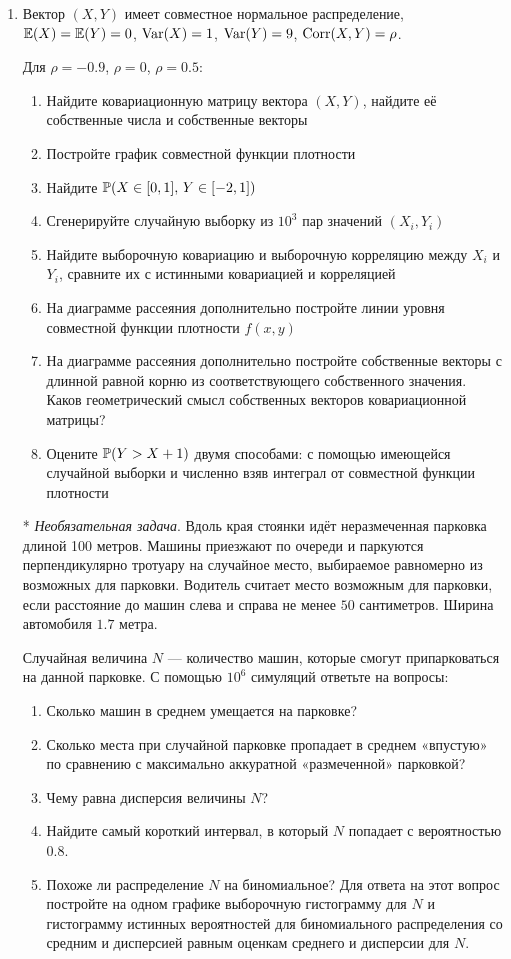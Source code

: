 \documentclass[12pt, a4paper]{article}\usepackage[]{graphicx}\usepackage[]{color}
\begin{document}
\begin{enumerate}
\item Вектор $(X,Y)$ имеет совместное нормальное распределение, $\E(X)=\E(Y)=0$, $\Var(X)=1$, $\Var(Y)=9$, $\Corr(X,Y)=\rho$.

Для $\rho=-0.9$, $\rho=0$, $\rho=0.5$:

\begin{enumerate}
\item Найдите ковариационную матрицу вектора  $(X,Y)$, найдите её собственные числа и собственные векторы
\item Постройте график совместной функции плотности
\item Найдите $\P(X\in [0,1], \, Y\in [-2,1] )$
\item Сгенерируйте случайную выборку из $10^3$ пар значений $(X_i,Y_i)$
\item Найдите выборочную ковариацию и выборочную корреляцию между $X_i$ и $Y_i$, сравните их с истинными ковариацией и корреляцией
\item На диаграмме рассеяния дополнительно постройте линии уровня совместной функции плотности $f(x,y)$
\item На диаграмме рассеяния дополнительно постройте собственные векторы с длинной равной корню из соответствующего собственного значения. Каков геометрический смысл собственных векторов ковариационной матрицы?
\item Оцените $\P(Y>X+1)$ двумя способами: с помощью имеющейся случайной выборки и численно взяв интеграл от совместной функции плотности
\end{enumerate}


\item[*] \textit{Необязательная задача}. Вдоль края стоянки идёт неразмеченная парковка длиной 100 метров. Машины приезжают по очереди и паркуются перпендикулярно тротуару на случайное место, выбираемое равномерно из возможных для парковки. Водитель считает место возможным для парковки, если расстояние до машин слева и справа не менее $50$ сантиметров. Ширина автомобиля $1.7$ метра.

Случайная величина $N$ — количество машин, которые смогут припарковаться на данной парковке. С помощью $10^6$ симуляций ответьте на вопросы:
\begin{enumerate}
\item Сколько машин в среднем умещается на парковке?
\item Сколько места при случайной парковке пропадает в среднем «впустую» по сравнению с максимально аккуратной «размеченной» парковкой?
\item Чему равна дисперсия величины $N$?
\item Найдите самый короткий интервал, в который $N$ попадает с вероятностью $0.8$.
\item Похоже ли распределение $N$ на биномиальное? Для ответа на этот вопрос постройте на одном графике выборочную гистограмму для $N$ и гистограмму истинных вероятностей для биномиального распределения со средним и дисперсией равным оценкам среднего и дисперсии для $N$.
\end{enumerate}


\end{enumerate}
\end{document}
